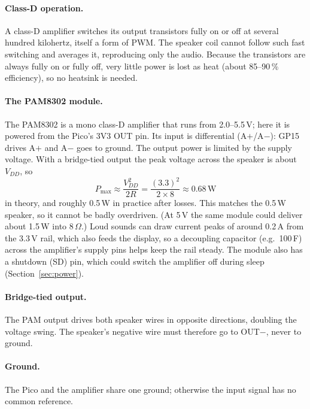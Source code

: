\documentclass[11pt,a4paper]{article}
\newcommand{\unit}[2]{\ensuremath{#1\,\mathrm{#2}}}
\begin{document}
\paragraph{Class-D operation.} A class-D amplifier switches its output
transistors fully on or off at several hundred kilohertz, itself a form of PWM.
The speaker coil cannot follow such fast switching and averages it, reproducing
only the audio. Because the transistors are always fully on or fully off, very
little power is lost as heat (about 85--90\,\% efficiency), so no heatsink is
needed.

\paragraph{The PAM8302 module.} The PAM8302 is a mono class-D amplifier that
runs from 2.0--5.5\,V; here it is powered from the Pico's 3V3 OUT pin. Its
input is differential (A$+$/A$-$): GP15 drives A$+$ and A$-$ goes to ground.
The output power is limited by the supply voltage. With a bridge-tied output the
peak voltage across the speaker is about $V_{DD}$, so
\[
  P_{\max} \approx \frac{V_{DD}^2}{2R} = \frac{(3.3)^2}{2 \times 8} \approx \unit{0.68}{W}
\]
in theory, and roughly 0.5\,W in practice after losses. This matches the
0.5\,W speaker, so it cannot be badly overdriven. (At 5\,V the same module could
deliver about 1.5\,W into 8\,$\Omega$.) Loud sounds can draw current peaks of
around 0.2\,A from the 3.3\,V rail, which also feeds the display, so a decoupling
capacitor (e.g.\ 100\,\textmu F) across the amplifier's supply pins helps keep
the rail steady. The module also has a shutdown (SD) pin,
which could switch the amplifier off during sleep (Section~\ref{sec:power}).

\paragraph{Bridge-tied output.} The PAM output drives both speaker wires in
opposite directions, doubling the voltage swing. The speaker's negative wire
must therefore go to OUT$-$, never to ground.

\paragraph{Ground.} The Pico and the amplifier share one ground; otherwise the
input signal has no common reference.

\end{document}
